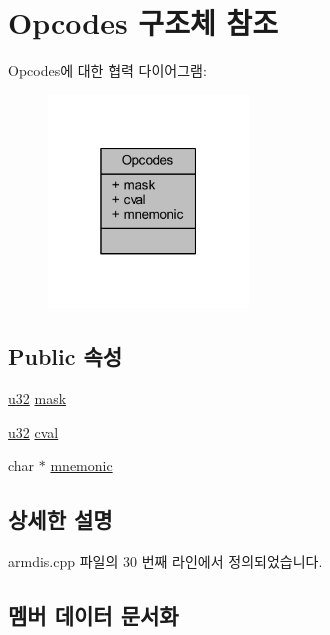 \hypertarget{struct_opcodes}{}\section{Opcodes 구조체 참조}
\label{struct_opcodes}


Opcodes에 대한 협력 다이어그램\+:\nopagebreak
\begin{figure}[H]
\begin{center}
\leavevmode
\includegraphics[width=151pt]{struct_opcodes__coll__graph}
\end{center}
\end{figure}
\subsection*{Public 속성}
\begin{DoxyCompactItemize}
\item 
\mbox{\hyperlink{_system_8h_a10e94b422ef0c20dcdec20d31a1f5049}{u32}} \mbox{\hyperlink{struct_opcodes_a78e77d19cd457c2d1a665ccbcc5fef41}{mask}}
\item 
\mbox{\hyperlink{_system_8h_a10e94b422ef0c20dcdec20d31a1f5049}{u32}} \mbox{\hyperlink{struct_opcodes_ad17d40d63e52c5714a043cc7287046e7}{cval}}
\item 
char $\ast$ \mbox{\hyperlink{struct_opcodes_a1999a6e81f58365cbd0164e5626d445a}{mnemonic}}
\end{DoxyCompactItemize}


\subsection{상세한 설명}


armdis.\+cpp 파일의 30 번째 라인에서 정의되었습니다.



\subsection{멤버 데이터 문서화}
\mbox{\label{struct_opcodes_ad17d40d63e52c5714a043cc7287046e7}} 
